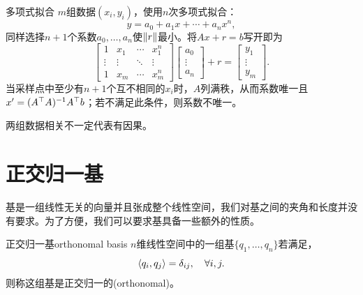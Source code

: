 \begin{example}{多项式拟合}{}
	$m$组数据$(x_i,y_i)$，使用$n$次多项式拟合：
	\[
		y = a_0 + a_1x + \cdots + a_nx^n,
	\]
	同样选择$n + 1$个系数$a_0,\ldots,a_n$使$\lVert r\rVert$最小。将$Ax + r = b$写开即为
	\[
		\begin{bmatrix}
			1&x_1&\cdots&x_1^n\\\vdots&\vdots&\ddots&\vdots\\1&x_m&\cdots&x_m^n
		\end{bmatrix}
		\begin{bmatrix}
			a_0\\\vdots\\a_n
		\end{bmatrix} + r =
		\begin{bmatrix}
			y_1\\\vdots\\y_m
		\end{bmatrix}.
	\]
	当采样点中至少有$n + 1$个互不相同的$x_i$时，$A$列满秩，从而系数唯一且$x' = (A^\top A)^{-1} A^\top b$；若不满足此条件，则系数不唯一。
\end{example}

\begin{remark}
	两组数据相关不一定代表有因果。
\end{remark}

\section{正交归一基}

基是一组线性无关的向量并且张成整个线性空间，我们对基之间的夹角和长度并没有要求。为了方便，我们可以要求基具备一些额外的性质。
\begin{definition}{正交归一基}{orthonomal basis}
	$n$维线性空间中的一组基$\{q_1,\ldots,q_n\}$若满足， 
	\begin{equation}\label{eq:la-orthonormal-basis}
		\langle q_i,q_j\rangle = \delta_{ij},\quad\forall i,j.
	\end{equation}
	则称这组基是正交归一的(orthonomal)。
\end{definition}

